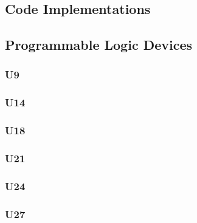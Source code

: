 \begin{appendices}
    \clearpage
    \newpage

    \section{Code Implementations} \label{appendix:code}

        \subsection{Programmable Logic Devices}

            \subsubsection{U9}


            \newpage
            \subsubsection{U14}


            \newpage
            \subsubsection{U18}


            \newpage
            \subsubsection{U21}


            \newpage
            \subsubsection{U24}


            \newpage
            \subsubsection{U27}


            \newpage

\end{appendices}
